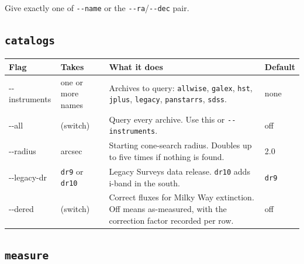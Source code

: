 \documentclass[11pt]{article}
\begin{document}
Give exactly one of \texttt{-{}-name} or the
\texttt{-{}-ra}/\texttt{-{}-dec} pair.

\subsection{\texttt{catalogs}}

\begin{longtable}{T{2.9cm} L{2.15cm} L{6.45cm} L{2.7cm}}
\toprule
\textbf{\normalfont Flag} & \textbf{Takes} & \textbf{What it does} & \textbf{Default} \\
\midrule
\endhead
-{}-instruments & one or more names & Archives to query: \texttt{allwise},
  \texttt{galex}, \texttt{hst}, \texttt{jplus}, \texttt{legacy},
  \texttt{panstarrs}, \texttt{sdss}. & none \\[2pt]
-{}-all & (switch) & Query every archive. Use this or
  \texttt{-{}-instruments}. & off \\[2pt]
-{}-radius & arcsec & Starting cone-search radius. Doubles up to five
  times if nothing is found. & 2.0 \\[2pt]
-{}-legacy-dr & \texttt{dr9} or \texttt{dr10} & Legacy Surveys data
  release. \texttt{dr10} adds i-band in the south. & \texttt{dr9} \\[2pt]
-{}-dered & (switch) & Correct fluxes for Milky Way extinction. Off means
  as-measured, with the correction factor recorded per row. & off \\
\bottomrule
\end{longtable}

\subsection{\texttt{measure}}
\end{document}
